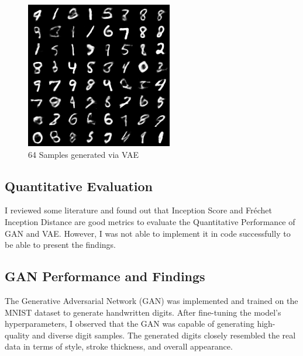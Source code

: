 \documentclass{article}
\begin{document}
\begin{figure}[ht]
\vskip 0.2in
\begin{center}
\centerline{\includegraphics[width=\columnwidth]{images/vae_sample.png}}
\caption{64 Samples generated via VAE}
\label{vae-sample}
\end{center}
\vskip -0.2in
\end{figure}

\subsection{Quantitative Evaluation}
I reviewed some literature and found out that Inception Score and Fréchet Inception Distance are good metrics to evaluate the Quantitative Performance of GAN and VAE. However, I was not able to implement it in code successfully to be able to present the findings.

\subsection{GAN Performance and Findings}
The Generative Adversarial Network (GAN) was implemented and trained on the MNIST dataset to generate handwritten digits. After fine-tuning the model's hyperparameters, I observed that the GAN was capable of generating high-quality and diverse digit samples. The generated digits closely resembled the real data in terms of style, stroke thickness, and overall appearance.
\end{document}
